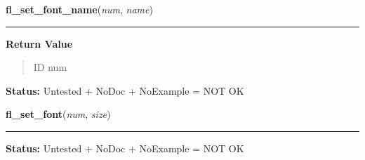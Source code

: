     \label{xformslib:library:fl_set_font_name}

    \vspace{0.5ex}

\hspace{.8\funcindent}\begin{boxedminipage}{\funcwidth}

    \raggedright \textbf{fl\_set\_font\_name}(\textit{num}, \textit{name})

    \vspace{-1.5ex}

    \rule{\textwidth}{0.5\fboxrule}
\setlength{\parskip}{2ex}
\setlength{\parskip}{1ex}
      \textbf{Return Value}
    \vspace{-1ex}

      \begin{quote}
      ID num

      \end{quote}

\textbf{Status:} Untested + NoDoc + NoExample = NOT OK



    \end{boxedminipage}

    \label{xformslib:library:fl_set_font}

    \vspace{0.5ex}

\hspace{.8\funcindent}\begin{boxedminipage}{\funcwidth}

    \raggedright \textbf{fl\_set\_font}(\textit{num}, \textit{size})

    \vspace{-1.5ex}

    \rule{\textwidth}{0.5\fboxrule}
\setlength{\parskip}{2ex}
\setlength{\parskip}{1ex}
\textbf{Status:} Untested + NoDoc + NoExample = NOT OK



    \end{boxedminipage}

    \label{xformslib:library:fl_get_char_height}

